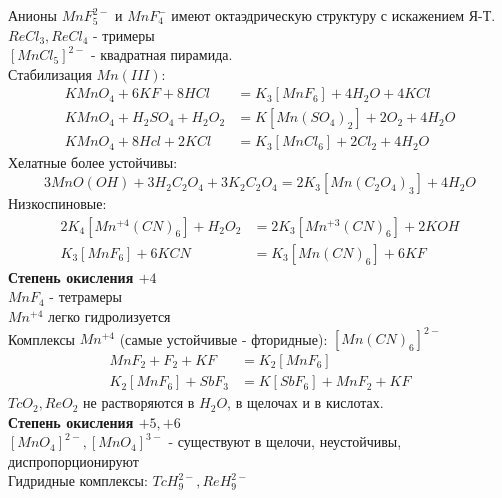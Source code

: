 Анионы $MnF_5^{2-}$ и $MnF_4^{-}$ имеют октаэдрическую структуру с искажением Я-Т. \\
$ReCl_3, ReCl_4$ - тримеры \\
$\left[MnCl_5 \right]^{2-} $ - квадратная пирамида. \\
Стабилизация $Mn(III)$:
\begin{align*}
KMnO_4 + 6 KF + 8HCl &= K_3\left[MnF_6 \right] + 4H_2O + 4KCl \\
KMnO_4 + H_2SO_4 + H_2O_2 &= K\left[Mn(SO_4)_2 \right] + 2O_2 + 4H_2O \\
KMnO_4 + 8Hcl + 2 KCl &= K_3\left[MnCl_6 \right] + 2Cl_2 + 4H_2O
\end{align*}
Хелатные более устойчивы:
\[
3MnO(OH) + 3H_2C_2O_4 + 3K_2C_2O_4 = 2K_3\left[Mn(C_2O_4)_3 \right] + 4H_2O
\]
Низкоспиновые:
\begin{align*}
2K_4\left[Mn^{+4}(CN)_6 \right] + H_2O_2 &= 2K_3\left[Mn^{+3}(CN)_6 \right] + 2KOH \\
K_3\left[MnF_6 \right] + 6KCN &= K_3\left[Mn(CN)_6 \right]	+ 6KF
\end{align*}
\textbf{Степень окисления $+4$} \\
$MnF_4$ - тетрамеры \\
$Mn^{+4}$ легко гидролизуется \\
Комплексы $Mn^{+4}$ (самые устойчивые - фторидные):
$\left[Mn(CN)_6 \right]^{2-}$ \\
\begin{align*}
MnF_2 + F_2 + KF &= K_2\left[MnF_6 \right] \\
K_2\left[MnF_6 \right] + SbF_3 &= K\left[SbF_6 \right] + MnF_2 + KF
\end{align*}
$TcO_2, ReO_2$ не растворяются в $H_2O$, в щелочах и в кислотах. \\
\textbf{Степень окисления $+5, +6$} \\
$\left[MnO_4 \right]^{2-}, \left[MnO_4 \right]^{3-}$ - существуют в щелочи, неустойчивы, диспропорционируют \\
Гидридные комплексы: $ TcH_9^{2-}, ReH_9^{2-} $
\begin{figure} [H]
	\centering {\texttt{[image: zz5]}}
\end{figure}

